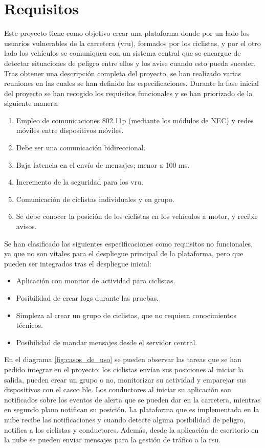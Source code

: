 \section{Requisitos}
Este proyecto tiene como objetivo crear una plataforma donde por un lado los
usuarios vulnerables de la carretera (\gls{vru}), formados por los ciclistas, y
por el otro lado los vehículos se comuniquen con un sistema central que se
encargue de detectar situaciones de peligro entre ellos y los avise cuando esto
pueda suceder. Tras obtener una descripción completa del proyecto, se han
realizado varias reuniones en las cuales se han definido las especificaciones.
Durante la fase inicial del proyecto se han recogido los requisitos funcionales
y se han priorizado de la siguiente manera:

\begin{enumerate}
	\item Empleo de comunicaciones \Gls{802.11p} (mediante los módulos de NEC) y
	redes móviles entre dispositivos móviles.
	\item Debe ser una comunicación bidireccional.
	\item Baja latencia en el envío de mensajes; menor a 100 ms.
	\item Incremento de la seguridad para los \gls{vru}.
	\item Comunicación de ciclistas individuales y en grupo.
	\item Se debe conocer la posición de los ciclistas en los vehículos a motor,
	y recibir avisos.
\end{enumerate}

Se han clasificado las siguientes especificaciones como requisitos no
funcionales, ya que no son vitales para el despliegue principal de la
plataforma, pero que pueden ser integrados tras el despliegue inicial:
\begin{itemize}
	\item Aplicación con monitor de actividad para ciclistas.
	\item Posibilidad de crear logs durante las pruebas.
	\item Simpleza al crear un grupo de ciclistas, que no requiera conocimientos
	técnicos.
	\item Posibilidad de mandar mensajes desde el servidor central.
\end{itemize}

En el diagrama \ref{fig:casos_de_uso} se pueden observar las tareas que se han
pedido integrar en el proyecto: los ciclistas envían sus posiciones al iniciar
la salida, pueden crear un grupo o no, monitorizar su actividad y emparejar sus
dispositivos con el casco \gls{ble}. Los conductores al iniciar su aplicación
son notificados sobre los eventos de alerta que se pueden dar en la carretera,
mientras en segundo plano notifican su posición. La plataforma que es
implementada en la nube recibe las notificaciones y cuando detecte alguna
posibilidad de peligro, notifica a los ciclistas y conductores. Además, desde la
aplicación de escritorio en la nube se pueden enviar mensajes para la gestión de
tráfico a la \gls{rsu}.

